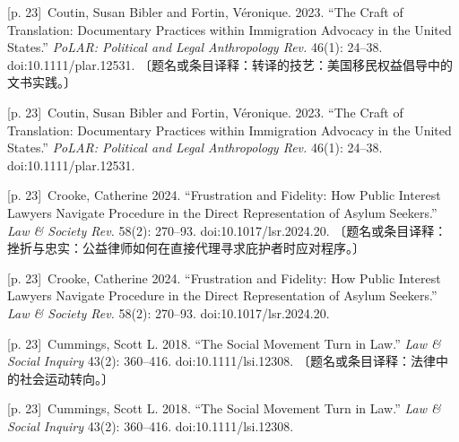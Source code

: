 \documentclass[10pt,a4paper]{article}
\begin{document}
\noindent\begin{minipage}{\textwidth}\begin{minipage}[t]{\dimexpr.5\textwidth-4mm\relax}{\scriptsize\color{gray} [p. 23]}\ Coutin, Susan Bibler and Fortin, Véronique. 2023. “The Craft of Translation: Documentary Practices within Immigration Advocacy in the United States.” \textit{PoLAR: Political and Legal Anthropology Rev.} 46(1): 24–38. doi:10.1111/plar.12531. 〔题名或条目译释：转译的技艺：美国移民权益倡导中的文书实践。〕\par\end{minipage}\hfill\begin{minipage}[t]{\dimexpr.5\textwidth-4mm\relax}{\scriptsize\color{gray} [p. 23]}\ Coutin, Susan Bibler and Fortin, Véronique. 2023. “The Craft of Translation: Documentary Practices within Immigration Advocacy in the United States.” \textit{PoLAR: Political and Legal Anthropology Rev.} 46(1): 24–38. doi:10.1111/plar.12531.\par\end{minipage}\end{minipage}\par
\noindent\begin{minipage}{\textwidth}\begin{minipage}[t]{\dimexpr.5\textwidth-4mm\relax}{\scriptsize\color{gray} [p. 23]}\ Crooke, Catherine 2024. “Frustration and Fidelity: How Public Interest Lawyers Navigate Procedure in the Direct Representation of Asylum Seekers.” \textit{Law \& Society Rev.} 58(2): 270–93. doi:10.1017/lsr.2024.20. 〔题名或条目译释：挫折与忠实：公益律师如何在直接代理寻求庇护者时应对程序。〕\par\end{minipage}\hfill\begin{minipage}[t]{\dimexpr.5\textwidth-4mm\relax}{\scriptsize\color{gray} [p. 23]}\ Crooke, Catherine 2024. “Frustration and Fidelity: How Public Interest Lawyers Navigate Procedure in the Direct Representation of Asylum Seekers.” \textit{Law \& Society Rev.} 58(2): 270–93. doi:10.1017/lsr.2024.20.\par\end{minipage}\end{minipage}\par
\noindent\begin{minipage}{\textwidth}\begin{minipage}[t]{\dimexpr.5\textwidth-4mm\relax}{\scriptsize\color{gray} [p. 23]}\ Cummings, Scott L. 2018. “The Social Movement Turn in Law.” \textit{Law \& Social Inquiry} 43(2): 360–416. doi:10.1111/lsi.12308. 〔题名或条目译释：法律中的社会运动转向。〕\par\end{minipage}\hfill\begin{minipage}[t]{\dimexpr.5\textwidth-4mm\relax}{\scriptsize\color{gray} [p. 23]}\ Cummings, Scott L. 2018. “The Social Movement Turn in Law.” \textit{Law \& Social Inquiry} 43(2): 360–416. doi:10.1111/lsi.12308.\par\end{minipage}\end{minipage}\par
\end{document}
